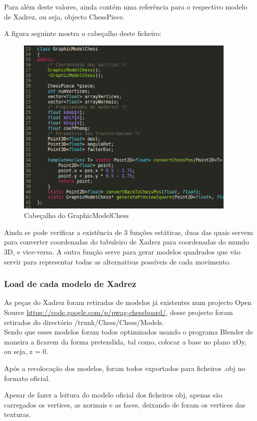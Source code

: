 \documentclass[11pt,a4paper]{report}
\begin{document}
Para além deste valores, ainda contém uma referência para o respectivo modelo de Xadrez, ou seja, objecto ChessPiece.

A figura seguinte mostra o cabeçalho deste ficheiro:

\begin{figure}[H]
\centerline{\includegraphics[width=300pt]{images/graphicmodelchess.png}}
\caption{Cabeçalho do GraphicModelChess}
\label{img:complete}
\end{figure}

Ainda se pode verificar a existência de 3 funções estáticas, duas das quais servem para converter coordenadas do tabuleiro de Xadrez para coordenadas do mundo 3D, e vice-versa. A outra função serve para gerar modelos quadrados que vão servir para representar todas as alternativas possíveis de cada movimento.

\subsubsection{Load de cada modelo de Xadrez}

As peças do Xadrez foram retiradas de modelos já existentes num projecto Open Source \url{https://code.google.com/p/pwag-chessboard/}, desse projecto foram retirados do directório /trunk/Chess/Chess/Models.\\

Sendo que esses modelos foram todos optimizados usando o programa Blender de maneira a ficarem da forma pretendida, tal como, colocar a base no plano xOy, ou seja, z = 0.

Após a recolocação dos modelos, foram todos exportados para ficheiros .obj no formato oficial.

Apesar de fazer a leitura do modelo oficial dos ficheiros obj, apenas são carregados os vertices, as normais e as faces, deixando de foram os vertices das texturas.
\end{document}
